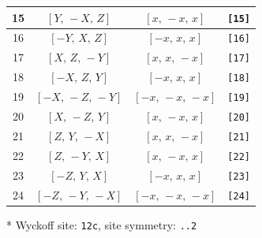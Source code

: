 \documentclass[fleqn,8pt]{jsarticle}
\begin{document}
\begin{longtable}{cccc}
15 & $\left[ Y,\, - X,\, Z \right]$ & $\left[ x,\, - x,\, x \right]$ & {\tt [15]} \\ \hline
16 & $\left[ - Y,\, X,\, Z \right]$ & $\left[ - x,\, x,\, x \right]$ & {\tt [16]} \\ \hline
17 & $\left[ X,\, Z,\, - Y \right]$ & $\left[ x,\, x,\, - x \right]$ & {\tt [17]} \\ \hline
18 & $\left[ - X,\, Z,\, Y \right]$ & $\left[ - x,\, x,\, x \right]$ & {\tt [18]} \\ \hline
19 & $\left[ - X,\, - Z,\, - Y \right]$ & $\left[ - x,\, - x,\, - x \right]$ & {\tt [19]} \\ \hline
20 & $\left[ X,\, - Z,\, Y \right]$ & $\left[ x,\, - x,\, x \right]$ & {\tt [20]} \\ \hline
21 & $\left[ Z,\, Y,\, - X \right]$ & $\left[ x,\, x,\, - x \right]$ & {\tt [21]} \\ \hline
22 & $\left[ Z,\, - Y,\, X \right]$ & $\left[ x,\, - x,\, x \right]$ & {\tt [22]} \\ \hline
23 & $\left[ - Z,\, Y,\, X \right]$ & $\left[ - x,\, x,\, x \right]$ & {\tt [23]} \\ \hline
24 & $\left[ - Z,\, - Y,\, - X \right]$ & $\left[ - x,\, - x,\, - x \right]$ & {\tt [24]} \\
\end{longtable}
* Wyckoff site: {\tt 12c}, site symmetry: {\tt ..2}
\renewcommand{\arraystretch}{1.2}
\end{document}
